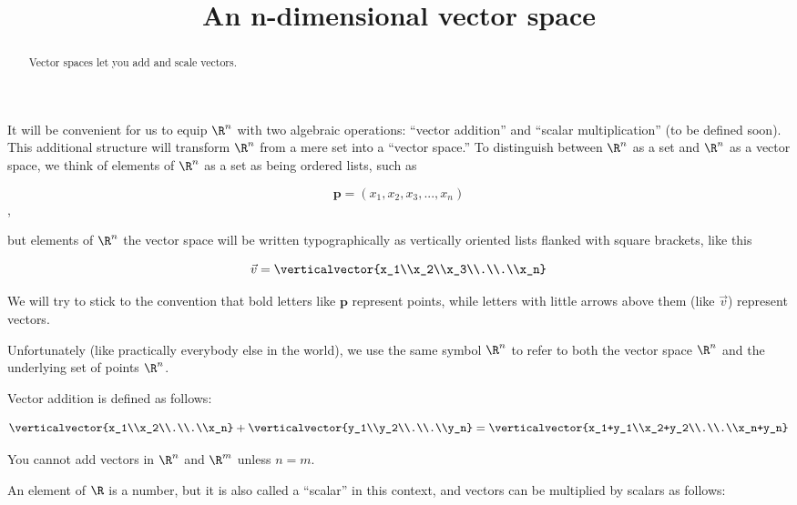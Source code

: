 \documentclass{ximera}
\title{An n-dimensional vector space}
\begin{document}
\begin{abstract}
  Vector spaces let you add and scale vectors.
\end{abstract}

It will be convenient for us to equip $\R^n$ with two algebraic
operations: ``vector addition'' and ``scalar multiplication'' (to be
defined soon).  This additional structure will transform $\R^n$ from a
mere set into a ``vector space.''  To distinguish between $\R^n$ as a
set and $\R^n$ as a vector space, we think of elements of $\R^n$ as a
set as being ordered lists, such as
 
 \[\mathbf{p} = (x_1,x_2,x_3, ...,x_n)\],
 
but elements of $\R^n$ the vector space will be written typographically as vertically oriented lists flanked with square brackets, like this 
 
  \[ \vec{v}= \verticalvector{x_1\\x_2\\x_3\\.\\.\\x_n}\]
 
We will try to stick to the convention that bold letters like $\mathbf{p}$ represent points, while letters with little arrows above them (like $\vec{v}$) represent vectors. 

Unfortunately (like practically everybody else in the world), we use
the same symbol $\R^n$ to refer to both the vector space $\R^n$ and
the underlying set of points $\R^n$.
 
Vector addition is defined as follows:
 
\[\verticalvector{x_1\\x_2\\.\\.\\x_n} +\verticalvector{y_1\\y_2\\.\\.\\y_n}=\verticalvector{x_1+y_1\\x_2+y_2\\.\\.\\x_n+y_n}\]

\begin{warning}
  You cannot add vectors in $\R^n$ and $\R^m$ unless $n = m$.
\end{warning}

An element of $\R$ is a number, but it is also called a ``scalar'' in this context, and vectors can be multiplied by scalars as follows:
	
\end{document}

